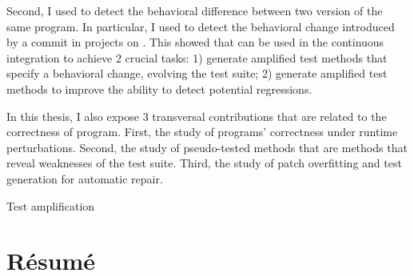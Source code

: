 \documentclass[a4paper,11pt,twoside,table]{style}
\begin{document}
\begin{vcenterpage}
Second, I used \dspot to detect the behavioral difference between two version of the same program.
In particular, I used \dspot to detect the behavioral change introduced by a commit in projects on \gh.
This showed that \dspot can be used in the continuous integration to achieve 2 crucial tasks: 
1) generate amplified test methods that specify a behavioral change, evolving the test suite;
2) generate amplified test methods to improve the ability to detect potential regressions.

In this thesis, I also expose 3 transversal contributions that are related to the correctness of program.
First, the study of programs' correctness under runtime perturbations.
Second, the study of pseudo-tested methods that are methods that reveal weaknesses of the test suite.
Third, the study of patch overfitting and test generation for automatic repair.

Test amplification
\end{vcenterpage}

\cleardoublepage

\section*{R\'esum\'e}
\cleardoublepage

\tableofcontents
{}
\mtcaddchapter
\listoffigures
{}
\mtcaddchapter
\listoftables

\mainmatter










%

\renewcommand\bibname{Bibliography}


\end{document}
